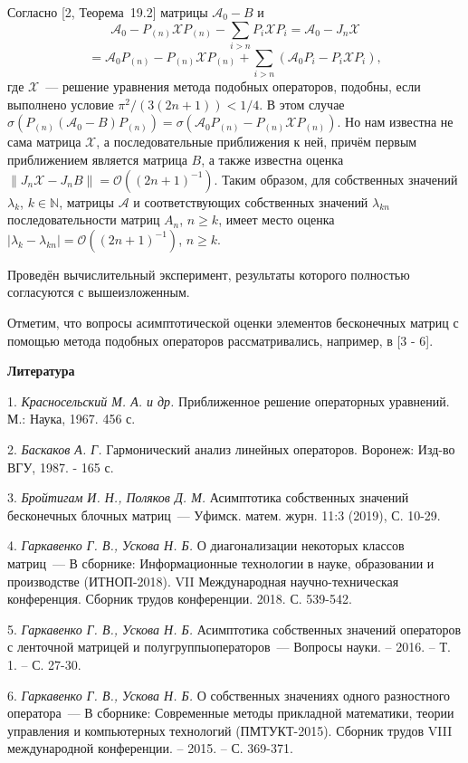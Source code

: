Согласно [2, Теорема~19.2] матрицы $\mathcal{A}_0-B$ и
$$
\mathcal{A}_0 - P_{(n)}\mathcal{X}P_{(n)}-\sum_{i>n}P_i\mathcal{X}P_i=\mathcal{A}_0-J_n\mathcal{X}
$$
$$
= \mathcal{A}_0P_{(n)}-P_{(n)}\mathcal{X}P_{(n)}+\sum_{i>n}(\mathcal{A}_0P_i-P_i\mathcal{X}P_i),
$$
где $\mathcal{X}$~--- решение уравнения метода подобных
операторов, подобны, если выполнено условие $\pi^2/(3(2n+1))<1/4$. В этом случае $\sigma(P_{(n)}(\mathcal{A}_0-B)P_{(n)})=
\sigma(\mathcal{A}_0P_{(n)}-P_{(n)}\mathcal{X}P_{(n)})$. Но нам известна не сама
матрица $\mathcal{X}$, а последовательные приближения к ней, причём первым приближением является матрица $B$, а также известна
оценка $\|J_n\mathcal{X}-J_nB\|=\mathcal{O}((2n+1)^{-1})$. Таким образом, для собственных значений $\lambda_k$, $k\in\mathbb{N}$,
матрицы $\mathcal{A}$ и соответствующих собственных значений $\lambda_{kn}$ последовательности матриц $A_n$, $n\geqslant k$,
имеет место оценка $|\lambda_k-\lambda_{kn}|=\mathcal{O}((2n+1)^{-1})$, $n\geqslant k$.

Проведён вычислительный эксперимент, результаты которого полностью согласуются с вышеизложенным.

Отметим, что вопросы асимптотической оценки элементов бесконечных матриц с помощью метода подобных операторов рассматривались,
например, в [3 - 6].


\smallskip \centerline {\bf Литература} \nopagebreak

1. {\it Красносельский М. А. и др.} Приближенное решение операторных уравнений. М.: Наука, 1967. 456 с.

2. {\it Баскаков А. Г.} Гармонический анализ линейных операторов. Воронеж: Изд-во ВГУ, 1987. - 165 с.

3. {\it Бройтигам И. Н., Поляков Д. М.} Асимптотика собственных значений бесконечных блочных матриц~--- Уфимск. матем. журн. 11:3
(2019), С. 10-29.

4. {\it Гаркавенко Г. В., Ускова Н. Б.} О диагонализации некоторых классов матриц~--- В сборнике: Информационные технологии в науке, образовании и производстве (ИТНОП-2018). VII Международная научно-техническая конференция. Сборник трудов конференции. 2018. С. 539-542.

5. {\it Гаркавенко Г. В., Ускова Н. Б.} Асимптотика собственных значений операторов с ленточной матрицей и полугруппыоператоров~---
Вопросы науки. -- 2016. -- Т. 1. -- С. 27-30.

6. {\it Гаркавенко Г. В., Ускова Н. Б.} О собственных значениях одного разностного оператора~---
В сборнике: Современные методы прикладной математики, теории управления и компьютерных технологий (ПМТУКТ-2015). Сборник трудов VIII международной конференции. -- 2015. -- С. 369-371.

